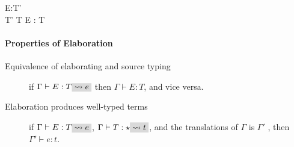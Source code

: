 




 {\Gamma\vdash E:T'  \\ \Gamma \vdash T' \leq
  T } {\Gamma \vdash E : T }


\paragraph{Properties of Elaboration}

\begin{description}
\item[{Equivalence of elaborating and source typing}] if $\Gamma
  \vdash E : T \trans{e}$ then $\Gamma \vdash E : T$, and vice versa.
\item[{Elaboration produces well-typed terms}] if $\Gamma \vdash E : T
  \trans{e}$, $\Gamma \vdash T : \star \trans{t}$, and the
  translations of $\Gamma$ is $\Gamma'$ , then
  $\Gamma' \vdash e : t$.

\end{description}






